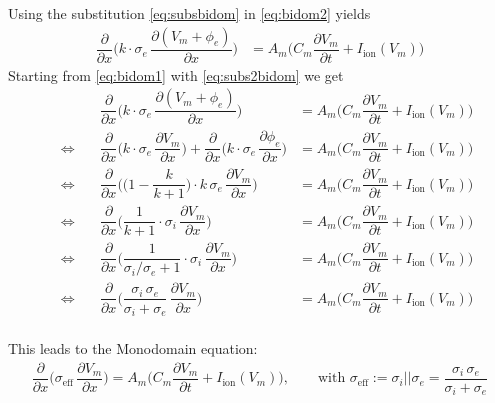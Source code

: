Using the substitution \eqref{eq:subsbidom} in \eqref{eq:bidom2} yields
\begin{equation*}
  \begin{array}{lll}
      \dfrac{\partial}{\partial x} \Big(k\cdot \sigma_e\,\dfrac{\partial(V_m + \phi_e)}{\partial x}\Big)
      &= A_m\Big(C_m \dfrac{\partial V_m}{\partial t} + I_\text{ion}(V_m)\Big)
  \end{array}
\end{equation*}
Starting from \eqref{eq:bidom1} with \eqref{eq:subs2bidom} we get
\begin{equation*}
  \begin{array}{lll}
      &\dfrac{\partial}{\partial x} \Big(k\cdot \sigma_e\,\dfrac{\partial(V_m + \phi_e)}{\partial x}\Big)
      &= A_m\Big(C_m \dfrac{\partial V_m}{\partial t} + I_\text{ion}(V_m)\Big)\\[4mm]
      \quad\Leftrightarrow\quad &
       \dfrac{\partial}{\partial x} \Big(k\cdot \sigma_e\,\dfrac{\partial V_m}{\partial x}\Big)
      + \dfrac{\partial}{\partial x} \Big(k\cdot \sigma_e\,\dfrac{\partial \phi_e}{\partial x}\Big)
      &= A_m\Big(C_m \dfrac{\partial V_m}{\partial t} + I_\text{ion}(V_m)\Big)\\[4mm]
      \quad\Leftrightarrow\quad &
       \dfrac{\partial}{\partial x} \Big(\big(1 - \dfrac{k}{k+1}\big)\cdot k\, \sigma_e\,\dfrac{\partial V_m}{\partial x}\Big)
      &= A_m\Big(C_m \dfrac{\partial V_m}{\partial t} + I_\text{ion}(V_m)\Big)\\[4mm]
      \quad\Leftrightarrow\quad &
       \dfrac{\partial}{\partial x} \Big(\dfrac{1}{k+1}\cdot \sigma_i\,\dfrac{\partial V_m}{\partial x}\Big)
      &= A_m\Big(C_m \dfrac{\partial V_m}{\partial t} + I_\text{ion}(V_m)\Big)\\[4mm]
    \quad\Leftrightarrow\quad &
       \dfrac{\partial}{\partial x} \Big(\dfrac{1}{\sigma_i/\sigma_e+1}\cdot \sigma_i\,\dfrac{\partial V_m}{\partial x}\Big)
      &= A_m\Big(C_m \dfrac{\partial V_m}{\partial t} + I_\text{ion}(V_m)\Big)\\[4mm]
    \quad\Leftrightarrow\quad &
       \dfrac{\partial}{\partial x} \Big(\dfrac{\sigma_i\,\sigma_e}{\sigma_i+\sigma_e}\,\dfrac{\partial V_m}{\partial x}\Big)
      &= A_m\Big(C_m \dfrac{\partial V_m}{\partial t} + I_\text{ion}(V_m)\Big)\\[4mm]
  \end{array}
\end{equation*}

This leads to the Monodomain equation:
\begin{equation*}
  \begin{array}{lll}
  \dfrac{\partial}{\partial x} \Big(\sigma_\text{eff}\,\dfrac{\partial V_m}{\partial x}\Big) = A_m\Big(C_m \dfrac{\partial V_m}{\partial t} + I_\text{ion}(V_m)\Big),\qquad
  \text{with }\sigma_\text{eff}:= \sigma_i || \sigma_e = \dfrac{\sigma_i\,\sigma_e}{\sigma_i+\sigma_e}
  \end{array}
\end{equation*}
